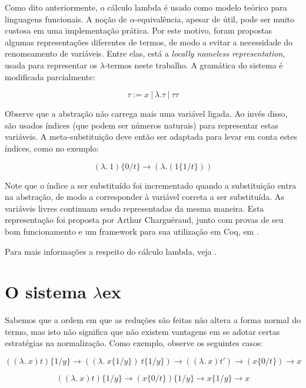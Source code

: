 Como dito anteriormente, o cálculo lambda é usado como modelo teórico para
linguagens funcionais. A noção de $\alpha$-equivalência, apesar de útil, pode ser
muito custosa em uma implementação prática. Por este motivo, foram propostas
algumas representações diferentes de termos, de modo a evitar a necessidade do
renomeamento de variáveis. Entre elas, está a \textit{locally nameless
    representation}, usada para representar os $\lambda$-termos neste trabalho.
A gramática do sistema é modificada parcialmente:

\[ \tau := x\ |\ \lambda . \tau\ |\ \tau \tau \]

Observe que a abstração não carrega mais uma variável ligada. Ao invés disso,
são usados índices (que podem ser números naturais) para representar estas
variáveis. A meta-substituição deve então ser adaptada para levar em conta estes
índices, como no exemplo:

\[ (\lambda.\ 1) \{0/t\} \rightarrow ( \lambda. (1 \{1/t\}) ) \]

Note que o índice a ser substituído foi incrementado quando a substituição entra
na abstração, de modo a corresponder à variável correta a ser substituída. As
variáveis livres continuam sendo representadas da mesma maneira. Esta
representação foi proposta por Arthur Charguéraud, junto com provas de
seu bom funcionamento e um framework para sua utilização em Coq, em
\cite{chargueraud}.

Para mais informações a respeito do cálculo lambda, veja \cite{barendregt}.


\section{O sistema $\lambda$ex}

Sabemos que a ordem em que as reduções são feitas não altera a forma normal do
termo, mas isto não significa que não existem vantagens em se adotar certas
estratégias na normalização. Como exemplo, observe os seguintes casos:

\[ ((\lambda.\ x) t) \{1/y\} \rightarrow ((\lambda.\ x\{1/y\})\ t\{1/y\}) 
    \rightarrow ((\lambda.\ x) t') \rightarrow (x\{0/t\}) \rightarrow x
\]

\[ ((\lambda.\ x) t) \{1/y\} \rightarrow (x\{0/t\}) \{1/y\} 
    \rightarrow x \{1/y\} \rightarrow x \]

